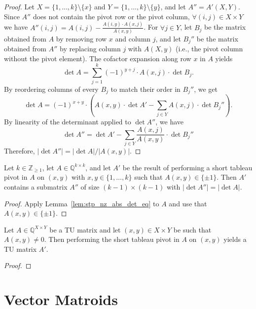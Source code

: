 \begin{proof}
    Let $X = \{1, \dots, k\} \setminus \{x\}$ and $Y = \{1, \dots, k\} \setminus \{y\}$, and let $A'' = A' (X, Y)$. Since $A''$ does not contain the pivot row or the pivot column, $\forall (i, j) \in X \times Y$ we have $A'' (i, j) = A (i, j) - \frac{A (i, y) \cdot A (x, j)}{A (x, y)}$. For $\forall j \in Y$, let $B_{j}$ be the matrix obtained from $A$ by removing row $x$ and column $j$, and let $B_{j}''$ be the matrix obtained from $A''$ by replacing column $j$ with $A (X, y)$ (i.e., the pivot column without the pivot element). The cofactor expansion along row $x$ in $A$ yields
    \[
        \det A = \sum_{j = 1}^{k} (-1)^{y + j} \cdot A (x, j) \cdot \det B_{j}.
    \]
    By reordering columns of every $B_{j}$ to match their order in $B_{j}''$, we get
    \[
        \det A = (-1)^{x + y} \cdot \left( A (x, y) \cdot \det A' - \sum_{j \in Y} A (x, j) \cdot \det B_{j}'' \right).
    \]
    By linearity of the determinant applied to $\det A''$, we have
    \[
        \det A'' = \det A' - \sum_{j \in Y} \frac{A (x, j)}{A (x, y)} \cdot \det B_{j}''
    \]
    Therefore, $|\det A''| = |\det A| / |A (x, y)|$.
\end{proof}

\begin{lemma}\label{lem:stp_pn_abs_det_eq}
    Let $k \in \mathbb{Z}_{\geq 1}$, let $A \in \mathbb{Q}^{k \times k}$, and let $A'$ be the result of performing a short tableau pivot in $A$ on $(x, y)$ with $x, y \in \{1, \dots, k\}$ such that $A (x, y) \in \{\pm 1\}$. Then $A'$ contains a submatrix $A''$ of size $(k - 1) \times (k - 1)$ with $|\det A''| = |\det A|$.
\end{lemma}

\begin{proof}
    Apply Lemma~\ref{lem:stp_nz_abs_det_eq} to $A$ and use that $A (x, y) \in \{\pm 1\}$.
\end{proof}

\begin{lemma}\label{lem:stp_tu}
    Let $A \in \mathbb{Q}^{X \times Y}$ be a TU matrix and let $(x, y) \in X \times Y$ be such that $A (x, y) \neq 0$. Then performing the short tableau pivot in $A$ on $(x, y)$ yields a TU matrix $A'$.
\end{lemma}

\begin{proof}
    \SeeLean
\end{proof}


\section{Vector Matroids}

